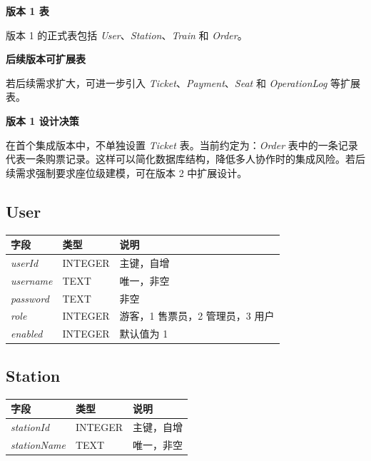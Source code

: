 \documentclass[10pt,twocolumn]{ctexart}
\begin{document}
\textbf{版本 1 表}

版本 1 的正式表包括 \textit{User}、\textit{Station}、\textit{Train} 和 \textit{Order}。

\textbf{后续版本可扩展表}

若后续需求扩大，可进一步引入 \textit{Ticket}、\textit{Payment}、\textit{Seat} 和 \textit{OperationLog} 等扩展表。

\textbf{版本 1 设计决策}

在首个集成版本中，不单独设置 \textit{Ticket} 表。当前约定为：\textit{Order} 表中的一条记录代表一条购票记录。这样可以简化数据库结构，降低多人协作时的集成风险。若后续需求强制要求座位级建模，可在版本 2 中扩展设计。

\subsection*{User}
\begin{tabular}{>{\raggedright\arraybackslash}p{} >{\raggedright\arraybackslash}p{} >{\raggedright\arraybackslash}p{}}
\toprule
字段 & 类型 & 说明 \\
\midrule
\textit{userId} & INTEGER & 主键，自增 \\
\textit{username} & TEXT & 唯一，非空 \\
\textit{password} & TEXT & 非空 \\
\textit{role} & INTEGER & 0 游客，1 售票员，2 管理员，3 用户 \\
\textit{enabled} & INTEGER & 默认值为 1 \\
\bottomrule
\end{tabular}

\subsection*{Station}
\begin{tabular}{>{\raggedright\arraybackslash}p{} >{\raggedright\arraybackslash}p{} >{\raggedright\arraybackslash}p{}}
\toprule
字段 & 类型 & 说明 \\
\midrule
\textit{stationId} & INTEGER & 主键，自增 \\
\textit{stationName} & TEXT & 唯一，非空 \\
\bottomrule
\end{tabular}
\end{document}
